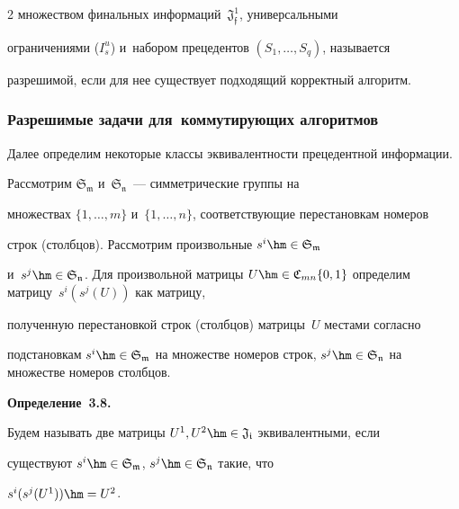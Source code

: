 \begin{multicols}{2}
множеством финальных информаций~$\mathfrak{J_{f}^1}$, универсальными 


ограничениями ($I_s^u$) и~набором прецедентов  $(S_1,\ldots,S_q)$, называется 


разрешимой, если для нее существует подходящий корректный алгоритм.





\subsubsection{Разрешимые  задачи для~коммутирующих алгоритмов}





Далее определим некоторые классы эквивалентности прецедентной информации.





Рассмотрим $\mathfrak{S_m}$ и~$\mathfrak{S_n}$~--- симметрические группы на 


множествах $\{1,\ldots,m\}$ и~$\{1,\ldots,n\}$, со\-от\-вет\-ст\-ву\-ющие перестановкам номеров 


строк (столбцов). Рассмотрим произвольные $s^i\hm\in \mathfrak{S_m}$  


и~$s^j\hm\in \mathfrak{S_n}$. Для произвольной матрицы $U \hm\in 


\mathfrak{C}_{mn}\{0,1\}$ определим матрицу~$s^i(s^j(U))$ как матрицу, 


полученную перестановкой строк (столбцов) матрицы~$U$ местами согласно 


подстановкам $s^i \hm\in \mathfrak{S_m}$ на множестве номеров строк,  $s^j \hm\in 


\mathfrak{S_n}$ на множестве номеров столбцов.





\smallskip





\noindent


\textbf{Определение~3.8.}\


Будем называть две матрицы $U^1, U^2 \hm\in \mathfrak{J_i}$ эквивалентными, если 


существуют $ s^i \hm\in \mathfrak{S_m}$,  $s^j \hm\in \mathfrak{S_n}$ такие, что 


$s^i(s^j(U^1)) \hm= U^2$.






\end{multicols}
